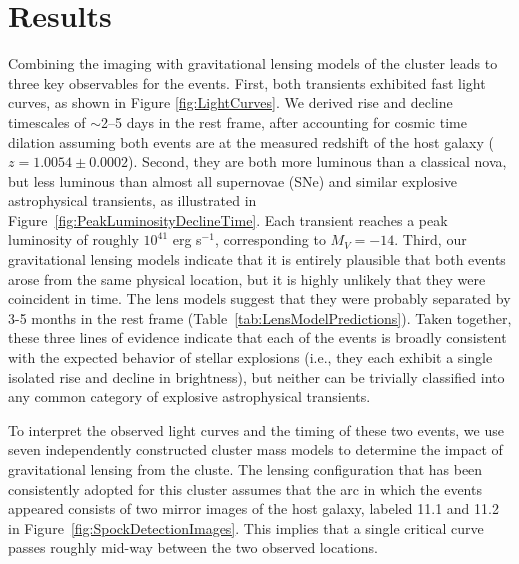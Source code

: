 \section{Results}\label{sec:Results}

Combining the \HST imaging with gravitational lensing models of the
 cluster leads to three key observables for the \spock
events. First, both transients exhibited fast light curves, as shown
in Figure \ref{fig:LightCurves}. We derived rise and decline
timescales of $\sim$2--5 days in the rest frame, after accounting for
cosmic time dilation assuming both events are at the measured redshift
of the host galaxy ($z=1.0054\pm0.0002$).  Second, they are both more
luminous than a classical nova, but less luminous than almost all
supernovae (SNe) and similar explosive astrophysical transients, as
illustrated in Figure~\ref{fig:PeakLuminosityDeclineTime}.  Each
transient reaches a peak luminosity of roughly $10^{41}$ erg s$^{-1}$,
corresponding to $M_V=-14$.  Third, our gravitational lensing models
indicate that it is entirely plausible that both events arose from the
same physical location, but it is highly unlikely that they were
coincident in time. The lens models suggest that they were probably
separated by 3-5 months in the rest frame
(Table~\ref{tab:LensModelPredictions}). Taken together, these three
lines of evidence indicate that each of the \spock events is broadly
consistent with the expected behavior of stellar explosions (i.e.,
they each exhibit a single isolated rise and decline in brightness),
but neither can be trivially classified into any common category of
explosive astrophysical transients.


To interpret the observed light curves and the timing of these two
events, we use seven independently constructed cluster mass models to
determine the impact of gravitational lensing from the 
cluste.  The lensing configuration
that has been consistently adopted for this cluster assumes that the
arc in which the \spock events appeared consists of two mirror images
of the host galaxy, labeled 11.1 and 11.2 in
Figure~\ref{fig:SpockDetectionImages}\cite{Zitrin:2013a,
  Jauzac:2014, Johnson:2014, Richard:2014, Diego:2015a, Grillo:2015,
  Hoag:2016, Sebesta:2016, Caminha:2017}.  This implies that a single
critical curve passes roughly mid-way between the two observed \spock
locations.

